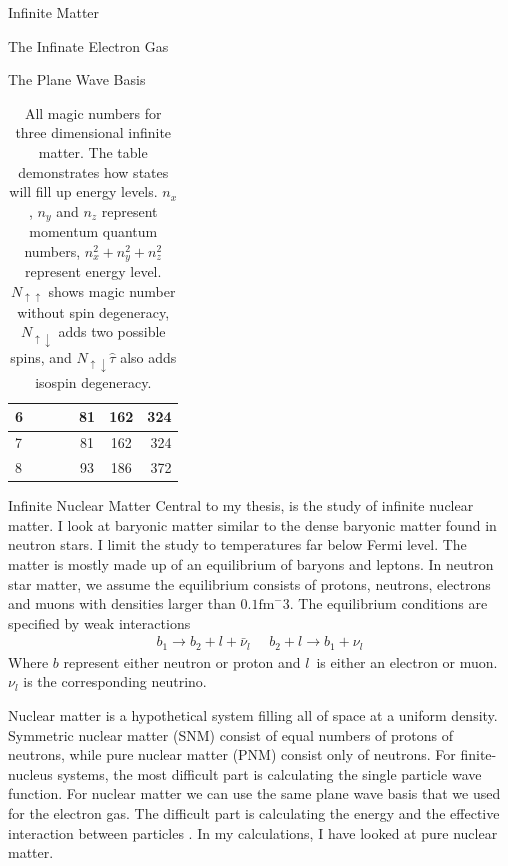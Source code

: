 \documentclass[twoside,english]{uiofysmaster}
\begin{document}
\begin{chapter}{Infinite Matter}
\begin{section}{The Infinate Electron Gas}
\begin{subsection}{The Plane Wave Basis}
\begin{table}[H]
\begin{center}
\begin{tabular}[center]{l | c c c | c | c | r }
						\hline
						6 &   &   &   & 81&162&324\\
						\hline
						7 &   &   &   & 81&162&324\\
						\hline
						8 &   &   &   & 93&186&372
					\end{tabular}
				\end{center}
				\caption{All magic numbers for three dimensional infinite matter. The table demonstrates how states will fill up energy levels. $n_x$, $n_y$ and $n_z$ represent momentum quantum numbers, $n_x^2 + n_y^2 + n_z^2$ represent energy level. $N_{\uparrow \uparrow}$ shows magic number without spin degeneracy, $N_{\uparrow \downarrow}$ adds two possible spins, and $N_{\uparrow \downarrow} \hat \tau $ also adds isospin degeneracy.} 
				\label{Magic Numbers 3d}
			\end{table}

		\end{subsection}

	\end{section}

	\begin{section}{Infinite Nuclear Matter}
		Central to my thesis, is the study of infinite nuclear matter. I look at baryonic matter similar to the dense baryonic matter found in neutron stars. I limit the study to temperatures far below Fermi level. The matter is mostly made up of an equilibrium of baryons and leptons. In neutron star matter, we assume the equilibrium consists of protons, neutrons, electrons and muons with densities larger than $0.1 \text{fm}^-3$. The equilibrium conditions are specified by weak interactions
		\begin{align}
		 	b_1 \rightarrow b_2 + l + \bar \nu_l \:\:\:\:\:\: b_2 + l \rightarrow b_1 + \nu_l
		\end{align} 
		Where $b$ represent either neutron or proton and $l$ is either an electron or muon. $\nu_l$ is the corresponding neutrino. 

		Nuclear matter is a hypothetical system filling all of space at a uniform density. Symmetric nuclear matter (SNM) consist of equal numbers of protons of neutrons, while pure nuclear matter (PNM) consist only of neutrons. For finite-nucleus systems, the most difficult part is calculating the single particle wave function. For nuclear matter we can use the same plane wave basis that we used for the electron gas. The difficult part is calculating the energy and the effective interaction between particles \cite{Day1967}. In my calculations, I have looked at pure nuclear matter. 
	\end{section}


\end{chapter}
\end{document}
